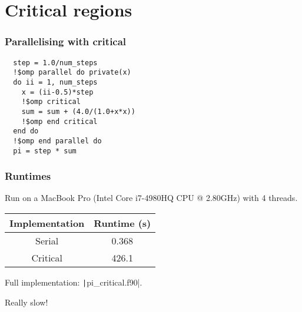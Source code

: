 \documentclass{beamer}
\begin{document}
\section{Critical regions}
\begin{frame}[fragile]
\frametitle{Parallelising with critical}

\begin{verbatim}
  step = 1.0/num_steps
  !$omp parallel do private(x)
  do ii = 1, num_steps
    x = (ii-0.5)*step
    !$omp critical
    sum = sum + (4.0/(1.0+x*x))
    !$omp end critical
  end do
  !$omp end parallel do
  pi = step * sum
\end{verbatim}

\end{frame}

\begin{frame}
\frametitle{Runtimes}
Run on a MacBook Pro (Intel Core i7-4980HQ CPU @ 2.80GHz) with 4 threads.

\vfill

\begin{table}
\begin{tabular}{cc}
\toprule
Implementation & Runtime (s) \\
\midrule
Serial   & 0.368 \\
Critical & 426.1 \\
\bottomrule
\end{tabular}
\end{table}

Full implementation: \texttt|pi_critical.f90|.

\begin{center}
\large Really slow!
\end{center}

\end{frame}
\end{document}
